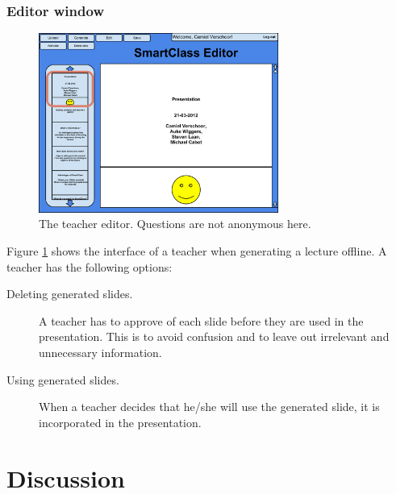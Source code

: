 \documentclass[11pt]{article}
\begin{document}
\subsubsection{Editor window}

\begin{figure}[!h]
\centering
\includegraphics[width=0.7\textwidth]{teacherInterfaceEditor.pdf}
\caption{The teacher editor. Questions are not anonymous here.}
\label{teacherInterfaceEditor}
\end{figure}

Figure \ref{teacherInterfaceEditor} shows the interface of a teacher when generating a lecture offline.
A teacher has the following options: 
\begin{description}
\item[Deleting generated slides.] A teacher has to approve of each slide before they are used in the presentation. This is to avoid confusion and to leave out irrelevant and unnecessary information.
\item[Using generated slides.] When a teacher decides that he/she will use the generated slide, it is incorporated in the presentation. 
\end{description}


\section{Discussion}
\end{document}
